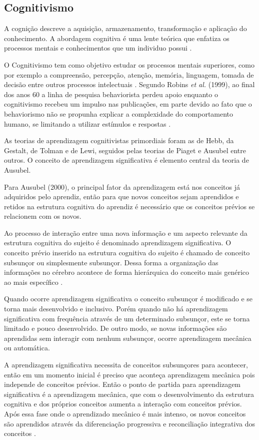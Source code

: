 \subsection{Cognitivismo}

A cognição descreve a aquisição, armazenamento, transformação e aplicação do conhecimento. A abordagem cognitiva é uma lente teórica que enfatiza os processos mentais e conhecimentos que um individuo possui \cite{matlin2004}.

O Cognitivismo tem como objetivo estudar os processos mentais superiores, como por exemplo a compreensão, percepção, atenção, memória, linguagem, tomada de decisão entre outros processos intelectuais \cite{moreira1999}.
Segundo Robins \textit{et al.} (1999), ao final dos anos 60 a linha de pesquisa behaviorista perdeu apoio enquanto o cognitivismo recebeu um impulso nas publicações, em parte devido ao fato que o behaviorismo não  se propunha explicar a complexidade do comportamento humano, se limitando a utilizar estímulos e respostas \cite{robins1999, fragelli2010}.

As teorias de aprendizagem cognitivistas primordiais foram as de Hebb, da Gestalt, de Tolman e de Lewi, seguidos pelas teorias de Piaget e Ausubel entre outros. O conceito de aprendizagem significativa é elemento central da teoria de Ausubel.

Para Ausubel (2000), o principal fator da aprendizagem está nos conceitos já adquiridos pelo aprendiz, então para que novos conceitos sejam aprendidos e retidos na estrutura cognitiva do aprendiz é necessário que os conceitos prévios se relacionem com os novos.

Ao processo de interação entre uma nova informação e um aspecto relevante da estrutura cognitiva do sujeito é denominado aprendizagem significativa. O conceito prévio inserido na estrutura cognitiva do sujeito é chamado de conceito subsunçor ou simplesmente subsunçor. Dessa forma a organização das informações no cérebro acontece de forma hierárquica do conceito mais genérico ao mais específico \cite{ausubel2000}.

Quando ocorre aprendizagem significativa o conceito subsunçor é modificado e se torna mais desenvolvido e inclusivo. Porém quando não há aprendizagem significativa com frequência através de um determinado subsunçor, este se torna limitado e pouco desenvolvido. De outro modo, se novas informações são aprendidas sem interagir com nenhum subsunçor, ocorre aprendizagem mecânica ou automática.

A aprendizagem significativa necessita de conceitos subsunçores para acontecer, então em um momento inicial é preciso que aconteça aprendizagem mecânica pois independe de conceitos prévios. Então o ponto de partida para aprendizagem significativa é a aprendizagem mecânica, que com o desenvolvimento da estrutura cognitiva e dos próprios conceitos aumenta a interação com conceitos prévios. Após essa fase onde o aprendizado mecânico é mais intenso, os novos conceitos são aprendidos através da diferenciação progressiva e reconciliação integrativa dos conceitos \cite{ausubel2000, fragelli2010}.

